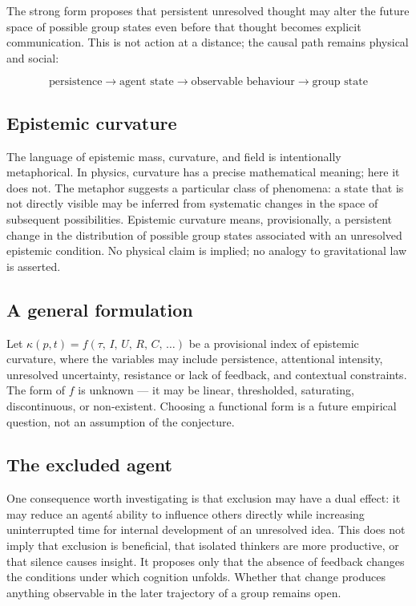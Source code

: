 \documentclass[10pt,twocolumn]{article}
\begin{document}
The strong form proposes that persistent unresolved thought may alter the future space of possible group states even before that thought becomes explicit communication. This is not action at a distance; the causal path remains physical and social:

\begin{equation}
\text{persistence} \rightarrow \text{agent state} \rightarrow \text{observable behaviour} \rightarrow \text{group state}
\end{equation}

\subsection*{Epistemic curvature}

The language of epistemic mass, curvature, and field is intentionally metaphorical. In physics, curvature has a precise mathematical meaning; here it does not. The metaphor suggests a particular class of phenomena: a state that is not directly visible may be inferred from systematic changes in the space of subsequent possibilities. Epistemic curvature means, provisionally, a persistent change in the distribution of possible group states associated with an unresolved epistemic condition. No physical claim is implied; no analogy to gravitational law is asserted.

\subsection*{A general formulation}

Let $\kappa(p,t) = f(\tau,\,I,\,U,\,R,\,C,\,\ldots)$ be a provisional index of epistemic curvature, where the variables may include persistence, attentional intensity, unresolved uncertainty, resistance or lack of feedback, and contextual constraints. The form of $f$ is unknown --- it may be linear, thresholded, saturating, discontinuous, or non-existent. Choosing a functional form is a future empirical question, not an assumption of the conjecture.

\subsection*{The excluded agent}

One consequence worth investigating is that exclusion may have a dual effect: it may reduce an agent\'s ability to influence others directly while increasing uninterrupted time for internal development of an unresolved idea. This does not imply that exclusion is beneficial, that isolated thinkers are more productive, or that silence causes insight. It proposes only that the absence of feedback changes the conditions under which cognition unfolds. Whether that change produces anything observable in the later trajectory of a group remains open.
\end{document}

